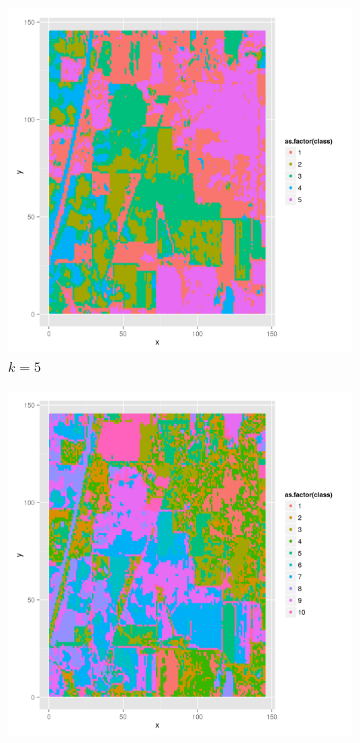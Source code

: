 \documentclass[10pt,letterpaper]{article}
\begin{document}
\begin{figure}
\begin{center}
\begin{subfigure}[b]{0.24\textwidth}
\includegraphics[width=\textwidth]{../Presentation/km5.png}
\caption{$k=5$}
\end{subfigure}
\begin{subfigure}[b]{0.24\textwidth}
\includegraphics[width=\textwidth]{../Presentation/km10.png}

\end{subfigure}
\end{center}
\end{figure}
\end{document}

